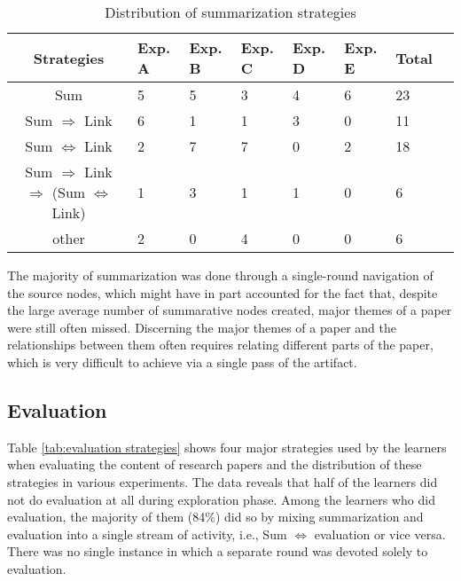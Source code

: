 \small
\begin{table}[hbtp]
    \caption{Distribution of summarization strategies}
    \begin{center}
    \begin{tabular} {||c|p{0.4in}|p{0.4in}|p{0.4in}|p{0.4in}|p{0.4in}|p{0.4in}|p{0.4in}||} \hline   
      {\bf Strategies} & {\bf Exp. A} & {\bf Exp. B} & {\bf Exp. C}
      & {\bf Exp. D} & {\bf Exp. E} & {\bf Total}\\ \hline \hline
      
      {\sf Sum } & 5 & 5 & 3 & 4 &  6 & 23 \\ \hline

      {\sf Sum } \({\Rightarrow}\) {\sf Link} &  6 & 1  & 1  & 3  & 0  & 11 \\ \hline

      {\sf Sum } \( \Leftrightarrow \) {\sf Link\/} & 2 & 7 & 7 & 0 & 2  & 18 \\ \hline
            
      {\sf Sum } \({\Rightarrow}\) {\sf Link\/} \({\Rightarrow}\)
      ({\sf Sum} \( \Leftrightarrow \) {\sf Link\/}) & 1 &3 &1 &1 &
      0& 6\\ \hline
      
      other & 2 & 0 & 4 & 0 & 0 & 6 \\ \hline
    \end{tabular}
    \end{center}
    \label{tab:summarization strategies}
\end{table}
\normalsize
{}

The majority of summarization was done through a single-round navigation of
the source nodes, which might have in part accounted for the fact that,
despite the large average number of summarative nodes created, major themes
of a paper were still often missed.  Discerning the major themes of a paper
and the relationships between them often requires relating different parts
of the paper, which is very difficult to achieve via a single pass of the
artifact.


\subsection{Evaluation}

Table \ref{tab:evaluation strategies} shows four major strategies used by
the learners when evaluating the content of research papers and the
distribution of these strategies in various experiments. The data reveals
that half of the learners did not do evaluation at all during exploration
phase. Among the learners who did evaluation, the majority of them (84\%)
did so by mixing summarization and evaluation into a single stream of
activity, i.e., {\sf Sum} \(\Leftrightarrow\) {\sf evaluation} or vice
versa. There was no single instance in which a separate round was devoted
solely to evaluation.

